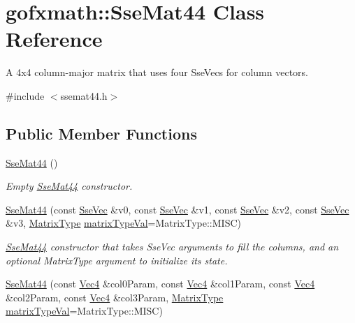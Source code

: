 \hypertarget{classgofxmath_1_1_sse_mat44}{}\section{gofxmath\+:\+:Sse\+Mat44 Class Reference}
\label{classgofxmath_1_1_sse_mat44}


A 4x4 column-\/major matrix that uses four Sse\+Vecs for column vectors.  




{\ttfamily \#include $<$ssemat44.\+h$>$}

\subsection*{Public Member Functions}
\begin{DoxyCompactItemize}
\item 
\hyperlink{classgofxmath_1_1_sse_mat44_a8db42e7f44beb87a0707a0897d12bf4f}{Sse\+Mat44} ()
\begin{DoxyCompactList}\small\item\em Empty \hyperlink{classgofxmath_1_1_sse_mat44}{Sse\+Mat44} constructor. \end{DoxyCompactList}\item 
\hyperlink{classgofxmath_1_1_sse_mat44_a2b356c67f6dd5f2e4039632806c54224}{Sse\+Mat44} (const \hyperlink{namespacegofxmath_a634570ddcd2496053ee966227080e02f}{Sse\+Vec} \&v0, const \hyperlink{namespacegofxmath_a634570ddcd2496053ee966227080e02f}{Sse\+Vec} \&v1, const \hyperlink{namespacegofxmath_a634570ddcd2496053ee966227080e02f}{Sse\+Vec} \&v2, const \hyperlink{namespacegofxmath_a634570ddcd2496053ee966227080e02f}{Sse\+Vec} \&v3, \hyperlink{group___s_i_s_d_mat_math_ga0434ae8f7ee0d8d40277184552eebef4}{Matrix\+Type} \hyperlink{classgofxmath_1_1_sse_mat44_a8526d131085d2a0745f26b6cb9ce26a3}{matrix\+Type\+Val}=Matrix\+Type\+::\+M\+I\+S\+C)
\begin{DoxyCompactList}\small\item\em \hyperlink{classgofxmath_1_1_sse_mat44}{Sse\+Mat44} constructor that takes Sse\+Vec arguments to fill the columns, and an optional Matrix\+Type argument to initialize its state. \end{DoxyCompactList}\item 
\hyperlink{classgofxmath_1_1_sse_mat44_a19be26773c32232fa54371a873dbc35b}{Sse\+Mat44} (const \hyperlink{classgofxmath_1_1_vec4}{Vec4} \&col0\+Param, const \hyperlink{classgofxmath_1_1_vec4}{Vec4} \&col1\+Param, const \hyperlink{classgofxmath_1_1_vec4}{Vec4} \&col2\+Param, const \hyperlink{classgofxmath_1_1_vec4}{Vec4} \&col3\+Param, \hyperlink{group___s_i_s_d_mat_math_ga0434ae8f7ee0d8d40277184552eebef4}{Matrix\+Type} \hyperlink{classgofxmath_1_1_sse_mat44_a8526d131085d2a0745f26b6cb9ce26a3}{matrix\+Type\+Val}=Matrix\+Type\+::\+M\+I\+S\+C)

\end{DoxyCompactItemize}
